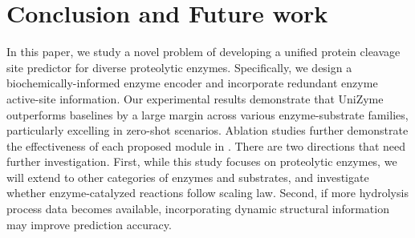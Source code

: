 \section{Conclusion and Future work}
In this paper, we study a novel problem of developing a unified protein cleavage site predictor for diverse proteolytic enzymes. Specifically, we design a biochemically-informed enzyme encoder and incorporate redundant enzyme active-site information. Our experimental results demonstrate that UniZyme outperforms baselines by a large margin across various enzyme-substrate families, particularly excelling in zero-shot scenarios. Ablation studies further demonstrate the effectiveness of each proposed module in {\method}. There are two directions that need further investigation. First, while this study focuses on proteolytic enzymes, we will extend to other categories of enzymes and substrates, and investigate whether enzyme-catalyzed reactions follow scaling law. Second, if more hydrolysis process data becomes available, incorporating dynamic structural information may improve prediction accuracy.

